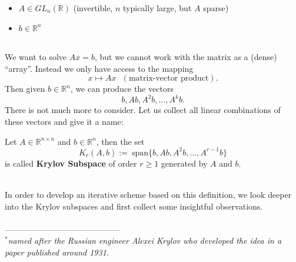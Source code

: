 \begin{frame}
	
		\begin{itemize}
			\item $A\in GL_n(\mathbb{R})$ (invertible, $n$ typically large, but $A$ sparse)
			\item $b\in\mathbb{R}^n$
		\end{itemize}
	~\\
		We want to solve $Ax=b$, but we cannot work with the matrix as a (dense) ``array''. Instead we only have access to the mapping
		$$
		x\mapsto Ax~~~(\text{matrix-vector product}).
		$$
		Then given $b\in\mathbb{R}^n$, we can produce the vectors
		$$
		b,Ab,A^2b,\dots,A^kb.
		$$
		There is not much more to consider. Let us collect all linear combinations of these vectors and give it a name:\\
		\begin{definition}
			Let $A\in\mathbb{R}^{n\times n}$ and $b\in\mathbb{R}^n$, then the set
			$$
			K_r(A,b):=~\text{span}\{b,Ab,A^2b,\dots,A^{r-1}b\}
			$$
			is called \textbf{Krylov Subspace} of order $r\geq 1$ generated by $A$ and $b$.
		\end{definition}
		~\\
		In order to develop an iterative scheme based on this definition, we look deeper into the Krylov subspaces and first collect some insightful observations.
		~\\
		~\\
		\footnotesize
		------------------------------------------\\
		\textit{$^*$named after the Russian engineer Alexei Krylov who developed the idea in a paper published around 1931.}
\end{frame}

